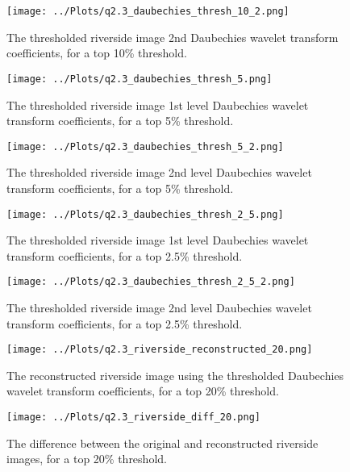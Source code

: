 \documentclass[12pt]{report} %
\begin{document}
\begin{figure}[htbp]
    \centering
    \texttt{[image: ../Plots/q2.3\_daubechies\_thresh\_10\_2.png]}
    \caption{The thresholded riverside image 2nd Daubechies wavelet transform coefficients, for a top 10\% threshold.}
    \label{fig:thresholded_image10_2}
\end{figure}

\begin{figure}[htbp]
    \centering
    \texttt{[image: ../Plots/q2.3\_daubechies\_thresh\_5.png]}
    \caption{The thresholded riverside image 1st level Daubechies wavelet transform coefficients, for a top 5\% threshold.}
    \label{fig:thresholded_image5}
\end{figure}

\begin{figure}[htbp]
    \centering
    \texttt{[image: ../Plots/q2.3\_daubechies\_thresh\_5\_2.png]}
    \caption{The thresholded riverside image 2nd level Daubechies wavelet transform coefficients, for a top 5\% threshold.}
    \label{fig:thresholded_image5_2}
\end{figure}

\begin{figure}[htbp]
    \centering
    \texttt{[image: ../Plots/q2.3\_daubechies\_thresh\_2\_5.png]}
    \caption{The thresholded riverside image 1st level Daubechies wavelet transform coefficients, for a top 2.5\% threshold.}
    \label{fig:thresholded_image2.5}
\end{figure}

\begin{figure}[htbp]
    \centering
    \texttt{[image: ../Plots/q2.3\_daubechies\_thresh\_2\_5\_2.png]}
    \caption{The thresholded riverside image 2nd level Daubechies wavelet transform coefficients, for a top 2.5\% threshold.}
    \label{fig:thresholded_image2.5_2}
\end{figure}


\begin{figure}[htbp]
    \centering
    \texttt{[image: ../Plots/q2.3\_riverside\_reconstructed\_20.png]}
    \caption{The reconstructed riverside image using the thresholded Daubechies wavelet transform coefficients, for a top 20\% threshold.}
    \label{fig:reconstructed_image20}
\end{figure}

\begin{figure}[htbp]
    \centering
    \texttt{[image: ../Plots/q2.3\_riverside\_diff\_20.png]}
    \caption{The difference between the original and reconstructed riverside images, for a top 20\% threshold.}
    \label{fig:diff_image20}
\end{figure}
\end{document}
